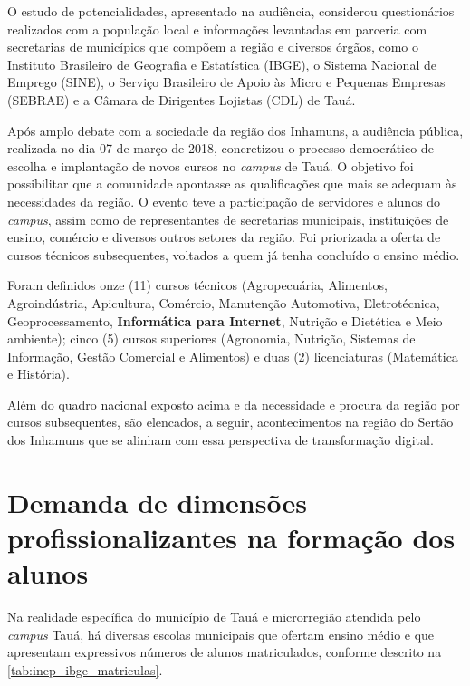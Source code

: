 \documentclass[
	12pt,				%
	openright,			%
	twoside,			%
	a4paper,			%
	chapter=TITLE,		%
	english,			%
	french,				%
	spanish,			%
	brazil,				%
	]{abntex2}
\begin{document}
O estudo de potencialidades, apresentado na audiência, considerou questionários
realizados com a população local e informações levantadas em parceria com
secretarias de municípios que compõem a região e diversos órgãos, como o
Instituto Brasileiro de Geografia e Estatística (IBGE), o Sistema Nacional de
Emprego (SINE), o Serviço Brasileiro de Apoio às Micro e Pequenas Empresas
(SEBRAE) e a Câmara de Dirigentes Lojistas (CDL) de Tauá.


Após amplo debate com a sociedade da região dos Inhamuns, a audiência pública,
realizada no dia 07 de março de 2018, concretizou o processo democrático de
escolha e implantação de novos cursos no \textit{campus} de Tauá. O objetivo foi
possibilitar que a comunidade apontasse as qualificações que mais se adequam às
necessidades da região. O evento teve a participação de servidores e alunos do
\textit{campus}, assim como de representantes de secretarias municipais, instituições de
ensino, comércio e diversos outros setores da região. Foi priorizada a oferta de
cursos técnicos subsequentes, voltados a quem já tenha concluído o ensino médio.


Foram definidos onze (11) cursos técnicos (Agropecuária, Alimentos,
Agroindústria, Apicultura, Comércio, Manutenção Automotiva, Eletrotécnica,
Geoprocessamento, \textbf{Informática para Internet}, Nutrição e Dietética e 
Meio ambiente); cinco (5) cursos superiores (Agronomia, Nutrição, Sistemas de
Informação, Gestão Comercial e Alimentos) e duas (2) licenciaturas (Matemática e
História).


Além do quadro nacional exposto acima  e da necessidade e procura da região por
cursos subsequentes, são elencados, a seguir, acontecimentos na região do Sertão
dos Inhamuns que se alinham com essa perspectiva de transformação digital.

\section{Demanda de dimensões profissionalizantes na formação  dos
alunos}

Na realidade específica do município de Tauá e microrregião atendida pelo \textit{campus} Tauá, há diversas escolas municipais que ofertam ensino médio e que apresentam expressivos números de alunos matriculados, conforme descrito na \autoref{tab:inep_ibge_matriculas}.
\end{document}
